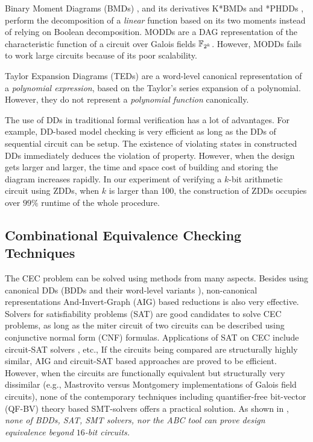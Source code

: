 Binary Moment Diagrams (BMDs) \cite{bmd}, and its derivatives K*BMDs
\cite{kbmd} and *PHDDs \cite{phdd}, perform the decomposition of a {\it linear} function
based on its two moments instead of relying on Boolean decomposition. 
MODDs \cite{modd} \cite{modd_tcomp} are a DAG representation of the
characteristic function of a circuit over Galois fields ${\mathbb{F}}_{2^k}$. 
However, MODDs fails to work large circuits because of its poor scalability.


Taylor Expansion Diagrams (TEDs) \cite{ted_tcomp} are a
word-level canonical representation of a {\it polynomial expression},
based on the Taylor's series expansion of a polynomial. However, they do
not represent a {\it polynomial function} canonically. 

The use of DDs in traditional formal verification has a lot of advantages. 
For example, DD-based model checking is very efficient as long as the DDs of sequential 
circuit can be setup. The existence of violating states in constructed DDs 
immediately deduces the violation of property. However, when the design gets
larger and larger, the time and space cost of building and storing the diagram 
increases rapidly. In our experiment of verifying a $k$-bit arithmetic circuit 
using ZDDs, when $k$ is larger than 100, the construction of ZDDs occupies 
over $99\%$ runtime of the whole procedure.
\subsection{Combinational Equivalence Checking Techniques}
The CEC problem can be solved using methods from many aspects.
Besides using canonical DDs (BDDs
\cite{BRYA86} and their word-level variants \cite{WLS}),
non-canonical representations And-Invert-Graph (AIG) based reductions \cite{AIG:2002}
\cite{alanmi:cec:iccad2006} is also very effective. 
Solvers for satisfiability problems (SAT) are good candidates to solve CEC problems,
as long as the miter circuit of two circuits can be described using conjunctive normal form (CNF)
formulas. Applications of SAT on CEC include circuit-SAT solvers \cite{csat}, etc.,
If the circuits being compared are structurally highly similar, AIG and circuit-SAT 
based approaches are proved to be efficient.
However, when the circuits are functionally equivalent but structurally very dissimilar (e.g.,
Mastrovito \cite{mastro:1989} versus Montgomery implementations
\cite{acar:1998} of Galois field circuits), none of the 
  contemporary techniques including quantifier-free bit-vector 
  (QF-BV) theory based SMT-solvers \cite{Cryptol:fmcad09}
  offers a practical solution. As shown in \cite{lv:phd}, {\it none of BDDs, SAT, SMT
  solvers, nor the  ABC tool can prove design equivalence beyond
  $16$-bit circuits.}     


